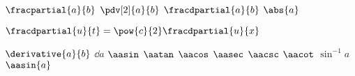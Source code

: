 $\fracpartial{a}{b}$
$\pdv[2]{a}{b}$
$\fracdpartial{a}{b}$
$\abs{a}$

$\fracdpartial{u}{t} = \pow{c}{2} \fracdpartial{u}{x}$

$\derivative{a}{b}$
$\dd{a}$ 
$\aasin$
$\aatan$
$\aacos$
$\aasec$
$\aacsc$
$\aacot$
\newp
$\sin^{-1}a$
\newp
$\aasin{a}$
